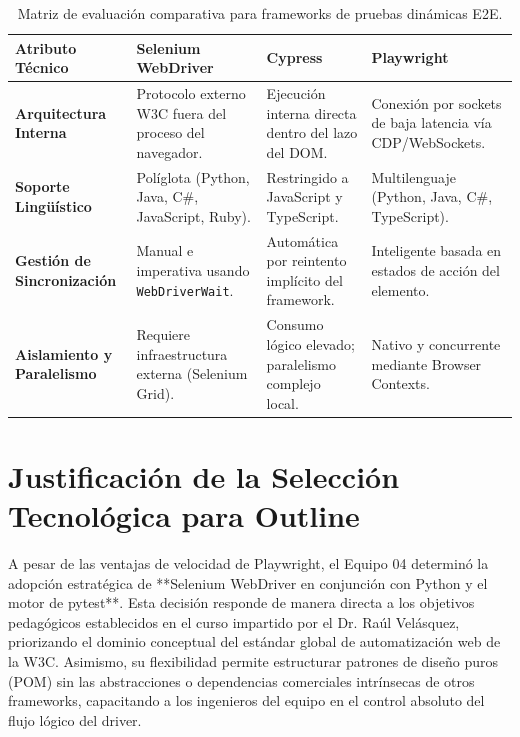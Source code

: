 \documentclass[12pt,oneside]{report}
\begin{document}
\begin{table}[H]
\centering
\caption{Matriz de evaluación comparativa para frameworks de pruebas dinámicas E2E.}
\small
\begin{tabularx}{\textwidth}{|p{3.2cm}|X|X|X|}
\hline
\textbf{Atributo Técnico} & \textbf{Selenium WebDriver} & \textbf{Cypress} & \textbf{Playwright} \\
\hline
\textbf{Arquitectura Interna} & Protocolo externo W3C fuera del proceso del navegador. & Ejecución interna directa dentro del lazo del DOM. & Conexión por sockets de baja latencia vía CDP/WebSockets. \\
\hline
\textbf{Soporte Lingüístico} & Políglota (Python, Java, C\#, JavaScript, Ruby). & Restringido a JavaScript y TypeScript. & Multilenguaje (Python, Java, C\#, TypeScript). \\
\hline
\textbf{Gestión de Sincronización} & Manual e imperativa usando \texttt{WebDriverWait}. & Automática por reintento implícito del framework. & Inteligente basada en estados de acción del elemento. \\
\hline
\textbf{Aislamiento y Paralelismo} & Requiere infraestructura externa (Selenium Grid). & Consumo lógico elevado; paralelismo complejo local. & Nativo y concurrente mediante Browser Contexts. \\
\hline
\end{tabularx}
\end{table}

\section{Justificación de la Selección Tecnológica para Outline}
A pesar de las ventajas de velocidad de Playwright, el Equipo 04 determinó la adopción estratégica de **Selenium WebDriver en conjunción con Python y el motor de pytest**. Esta decisión responde de manera directa a los objetivos pedagógicos establecidos en el curso impartido por el Dr. Raúl Velásquez, priorizando el dominio conceptual del estándar global de automatización web de la W3C. Asimismo, su flexibilidad permite estructurar patrones de diseño puros (POM) sin las abstracciones o dependencias comerciales intrínsecas de otros frameworks, capacitando a los ingenieros del equipo en el control absoluto del flujo lógico del driver.


\end{document}
